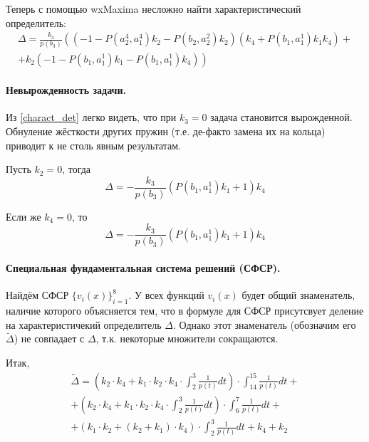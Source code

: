 \documentclass[a4paper,12pt]{article} %
\begin{document}
Теперь с помощью wxMaxima несложно найти характеристический определитель:
\begin{multline}\label{charact_det}
	\Delta =
	\frac{k_3}{p(b_3)}
	\left(
		\left( -1-P\left( a_2^4,a_1^4\right)  k_2-P\left( b_2,a_2^2\right)  k_2\right)
		\left( k_4+P\left( b_1,a_1^1\right)  k_1 k_4\right)
		\right. + \\ + \left.
		k_2 \left( -1-P\left( b_1,a_1^1\right)  k_1-P\left( b_1,a_1^1\right)  k_4\right)
	\right)
\end{multline}

\paragraph{Невырожденность задачи.}
Из \eqref{charact_det} легко видеть,
что при $k_3 = 0$ задача становится вырожденной.
Обнуление жёсткости других пружин (т.е. де-факто замена их на кольца)
приводит к не столь явным результатам.

Пусть $k_2 = 0$, тогда
\begin{equation}
	\Delta = - \frac{k_3}{p(b_3)} \left( P\left( b_1,a_1^1\right)  k_1+1\right)  k_4
\end{equation}

Если же $k_4 = 0$, то
\begin{equation}
	\Delta = - \frac{k_3}{p(b_3)} \left( P\left( b_1,a_1^1\right)  k_1+1\right)  k_4
\end{equation}


\paragraph{Специальная фундаментальная система решений (СФСР).}
Найдём СФСР $\{v_i(x)\}_{i=1}^{8}$.
У всех функций $v_i(x)$ будет общий знаменатель,
наличие которого объясняется тем,
что в формуле для СФСР присутсвует деление на характеристичекий определитель $\Delta$.
Однако этот знаменатель (обозначим его $\tilde{\Delta}$)
не совпадает с $\Delta$,
т.к. некоторые множители сокращаются.

Итак,
\begin{multline}
	\tilde{\Delta} =
	\left( k_2\cdot k_4+k_1\cdot k_2\cdot k_4\cdot \int_{2}^{3}\frac{1}{p\left( t\right) }dt\right) \cdot \int_{14}^{15}\frac{1}{p\left( t\right) }dt+
	\\+
	\left( k_2\cdot k_4+k_1\cdot k_2\cdot k_4\cdot \int_{2}^{3}\frac{1}{p\left( t\right) }dt\right) \cdot \int_{6}^{7}\frac{1}{p\left( t\right) }dt+
	\\+
	\left( k_1\cdot k_2+\left( k_2+k_1\right) \cdot k_4\right) \cdot \int_{2}^{3}\frac{1}{p\left( t\right) }dt+k_4+k_2
\end{multline}
\end{document}
